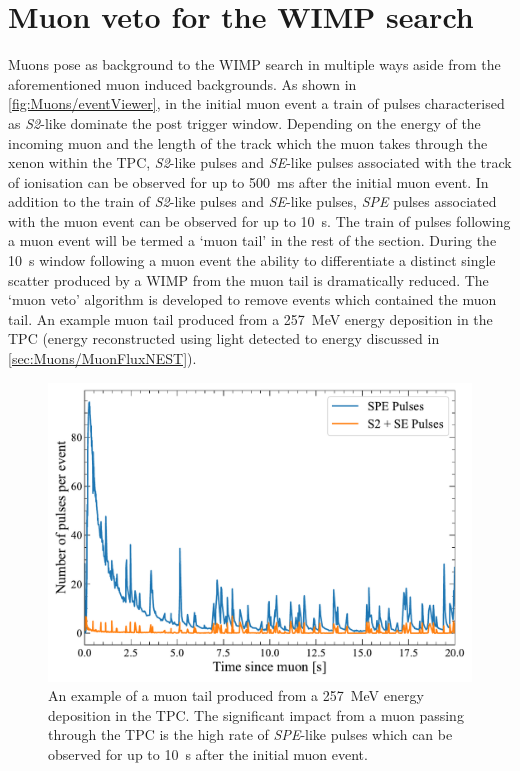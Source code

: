 \section{Muon veto for the WIMP search}\label{sec:Muons/MuonVeto}
Muons pose as background to the WIMP search in multiple ways aside from the aforementioned muon induced backgrounds. As shown in \autoref{fig:Muons/eventViewer}, in the initial muon event a train of pulses characterised as \textit{S2}-like dominate the post trigger window. Depending on the energy of the incoming muon and the length of the track which the muon takes through the xenon within the TPC, \textit{S2}-like pulses and \textit{SE}-like pulses associated with the track of ionisation can be observed for up to 500~ms after the initial muon event. In addition to the train of \textit{S2}-like pulses and \textit{SE}-like pulses, \textit{SPE} pulses associated with the muon event can be observed for up to 10~s. The train of pulses following a muon event will be termed a `muon tail' in the rest of the section. During the 10~s window following a muon event the ability to differentiate a distinct single scatter produced by a WIMP from the muon tail is dramatically reduced. The `muon veto' algorithm is developed to remove events which contained the muon tail. An example muon tail produced from a 257~MeV energy deposition in the TPC (energy reconstructed using light detected to energy discussed in \autoref{sec:Muons/MuonFluxNEST}).

\begin{figure}[h!]
    \centering
    \includegraphics[width=0.7\linewidth]{figures/Muons/PulsesOverTime.pdf}
    \caption[An example of a muon tail produced from a 257~MeV energy deposition in the TPC.]{An example of a muon tail produced from a 257~MeV energy deposition in the TPC. The significant impact from a muon passing through the TPC is the high rate of \textit{SPE}-like pulses which can be observed for up to 10~s after the initial muon event.}
    \label{fig:MuonTailExample}
\end{figure}

